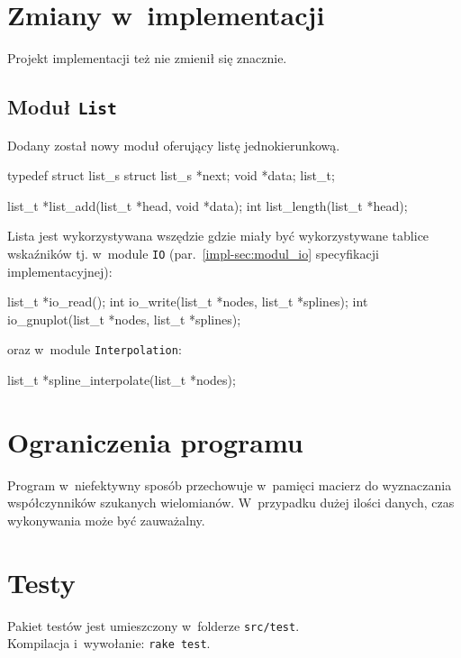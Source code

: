 \documentclass[10pt,a4paper]{article}
\begin{document}
\section{Zmiany w~implementacji}
Projekt implementacji też nie zmienił się znacznie.

\subsection{Moduł {\tt List}}
Dodany został nowy moduł oferujący listę jednokierunkową.
\begin{SmallVerbatim}
    typedef struct list_s {
      struct list_s *next;
      void *data;
    } list_t;

    list_t *list_add(list_t *head, void *data);
    int list_length(list_t *head);
\end{SmallVerbatim}

Lista jest wykorzystywana wszędzie gdzie miały być wykorzystywane tablice
wskaźników tj. w~module \texttt{IO} (par.~\ref{impl-sec:modul_io} specyfikacji
implementacyjnej):
\begin{SmallVerbatim}
    list_t *io_read();
    int io_write(list_t *nodes, list_t *splines);
    int io_gnuplot(list_t *nodes, list_t *splines);
\end{SmallVerbatim}
oraz w~module \texttt{Interpolation}:
\begin{SmallVerbatim}
    list_t *spline_interpolate(list_t *nodes);
\end{SmallVerbatim}

\section{Ograniczenia programu}
Program w~niefektywny sposób przechowuje w~pamięci macierz do wyznaczania
współczynników szukanych wielomianów. W~przypadku dużej ilości danych, czas
wykonywania może być zauważalny.

\section{Testy}
Pakiet testów jest umieszczony w~folderze {\tt src/test}.\\
Kompilacja i~wywołanie: {\tt rake test}.
\end{document}
